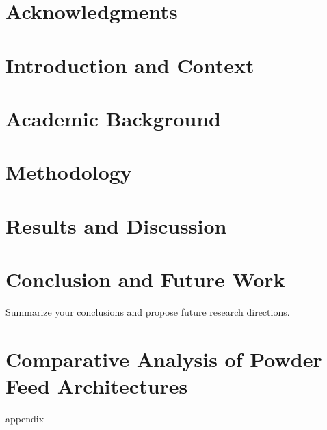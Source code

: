 \documentclass[11pt,a4paper]{report}
\begin{document}
\begin{abstract}

\end{abstract}

\chapter*{Acknowledgments}


\tableofcontents
\listoffigures
\listoftables

\newpage

\clearpage
{}

\chapter{Introduction and Context}


\chapter{Academic Background}


\chapter{Methodology}


\chapter{Results and Discussion}


\chapter{Conclusion and Future Work}
Summarize your conclusions and propose future research directions.

\newpage

\appendix

\chapter{Comparative Analysis of Powder Feed Architectures}

appendix\label{appendix:feed-architecture-analysis}
\end{document}
